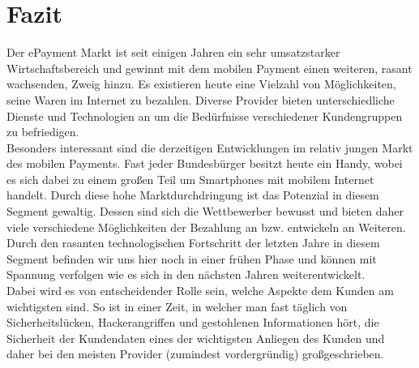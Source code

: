 \clearpage
\section{Fazit}
Der ePayment Markt ist seit einigen Jahren ein sehr umsatzstarker Wirtschaftsbereich und gewinnt mit dem mobilen Payment einen weiteren, rasant wachsenden, Zweig hinzu. Es existieren heute eine Vielzahl von Möglichkeiten, seine Waren im Internet zu bezahlen. Diverse Provider bieten unterschiedliche Dienste und Technologien an um die Bedürfnisse verschiedener Kundengruppen zu befriedigen.\\
Besonders interessant sind die derzeitigen Entwicklungen im relativ jungen Markt des mobilen Payments. Fast jeder Bundesbürger besitzt heute ein Handy, wobei es sich dabei zu einem großen Teil um Smartphones mit mobilem Internet handelt. Durch diese hohe Marktdurchdringung ist das Potenzial in diesem Segment gewaltig. Dessen sind sich die Wettbewerber bewusst und bieten daher viele verschiedene Möglichkeiten der Bezahlung an bzw. entwickeln an Weiteren. Durch den rasanten technologischen Fortschritt der letzten Jahre in diesem Segment befinden wir uns hier noch in einer frühen Phase und können mit Spannung verfolgen wie es sich in den nächsten Jahren weiterentwickelt.\\
Dabei wird es von entscheidender Rolle sein, welche Aspekte dem Kunden am wichtigsten sind. So ist in einer Zeit, in welcher man fast täglich von Sicherheitslücken, Hackerangriffen und gestohlenen Informationen hört, die Sicherheit der Kundendaten eines der wichtigsten Anliegen des Kunden und daher bei den meisten Provider (zumindest vordergründig) großgeschrieben.